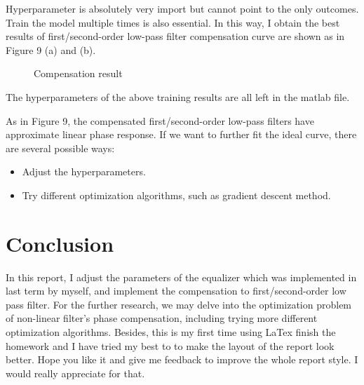 \documentclass[a4paper]{tufte-handout} %
\begin{document}
Hyperparameter is absolutely very import but cannot point to the only outcomes. Train the model multiple times is also essential. In this way, I obtain the best results of first/second-order low-pass filter compensation curve are shown as in Figure 9 (a) and (b). 
\begin{figure}[h!]
    \caption{Compensation result}
\end{figure}
The hyperparameters of the above training results are all left in the matlab file.

As in Figure 9, the compensated first/second-order low-pass filters have approximate linear phase response. If we want to further fit the ideal curve, there are several possible ways:
\begin{itemize}
  \item Adjust the hyperparameters.
  \item Try different optimization algorithms, such as gradient descent method.
\end{itemize}

\section{Conclusion}
In this report, I adjust the parameters of the equalizer which was implemented in last term by myself, and implement the compensation to first/second-order low pass filter. For the further research, we may delve into the optimization problem of non-linear filter's phase compensation, including trying more different optimization algorithms.
Besides, this is my first time using LaTex finish the homework and I have tried my best to to make the layout of the report look better. Hope you like it and give me feedback to improve the whole report style. I would really appreciate for that.
\end{document}
